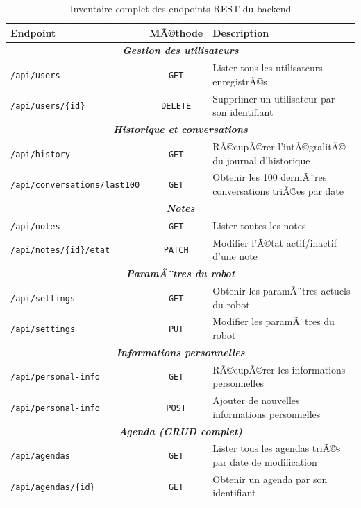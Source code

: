 \begin{table}[H]
\centering
\caption{Inventaire complet des endpoints REST du backend}
\label{tab:endpoints_mobile}
\renewcommand{\arraystretch}{1.2}
\small
\begin{tabular}{|l|c|p{6.5cm}|}
\hline
\textbf{Endpoint} & \textbf{MÃ©thode} & \textbf{Description} \\
\hline
\multicolumn{3}{|c|}{\textit{\textbf{Gestion des utilisateurs}}} \\
\hline
\texttt{/api/users} & \texttt{GET}
  & Lister tous les utilisateurs enregistrÃ©s \\
\texttt{/api/users/\{id\}} & \texttt{DELETE}
  & Supprimer un utilisateur par son identifiant \\
\hline
\multicolumn{3}{|c|}{\textit{\textbf{Historique et conversations}}} \\
\hline
\texttt{/api/history} & \texttt{GET}
  & RÃ©cupÃ©rer l'intÃ©gralitÃ© du journal d'historique \\
\texttt{/api/conversations/last100} & \texttt{GET}
  & Obtenir les 100 derniÃ¨res conversations triÃ©es par date \\
\hline
\multicolumn{3}{|c|}{\textit{\textbf{Notes}}} \\
\hline
\texttt{/api/notes} & \texttt{GET}
  & Lister toutes les notes \\
\texttt{/api/notes/\{id\}/etat} & \texttt{PATCH}
  & Modifier l'Ã©tat actif/inactif d'une note \\
\hline
\multicolumn{3}{|c|}{\textit{\textbf{ParamÃ¨tres du robot}}} \\
\hline
\texttt{/api/settings} & \texttt{GET}
  & Obtenir les paramÃ¨tres actuels du robot \\
\texttt{/api/settings} & \texttt{PUT}
  & Modifier les paramÃ¨tres du robot \\
\hline
\multicolumn{3}{|c|}{\textit{\textbf{Informations personnelles}}} \\
\hline
\texttt{/api/personal-info} & \texttt{GET}
  & RÃ©cupÃ©rer les informations personnelles \\
\texttt{/api/personal-info} & \texttt{POST}
  & Ajouter de nouvelles informations personnelles \\
\hline
\multicolumn{3}{|c|}{\textit{\textbf{Agenda (CRUD complet)}}} \\
\hline
\texttt{/api/agendas} & \texttt{GET}
  & Lister tous les agendas triÃ©s par date de modification \\
\texttt{/api/agendas/\{id\}} & \texttt{GET}
  & Obtenir un agenda par son identifiant \\

\end{tabular}
\end{table}
